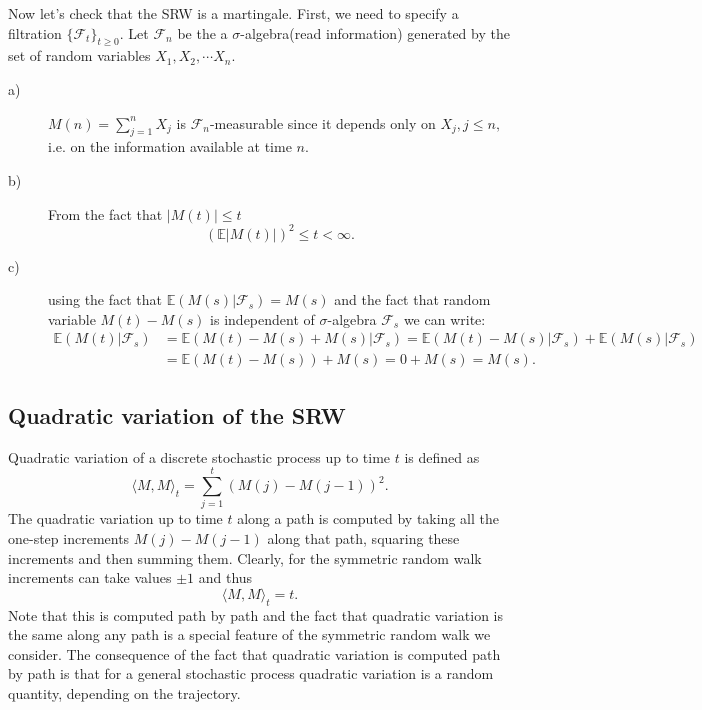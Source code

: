 \documentclass[reqno,psamsfonts, 10pt]{amsart}
\theoremstyle{remark}
\begin{document}
Now let's check that the SRW is a martingale. First, we need to
specify a filtration $\{ \mathcal{F}_t \}_{t \ge 0}.$ Let
$\mathcal{F}_n$ be the a $\sigma$-algebra(read information)
generated by the set of random variables $X_1, X_2, \dotsm X_n.$
\begin{description}
\item[a)] $M(n) = \sum \limits_{j=1}^n X_j$ is
$\mathcal{F}_n$-measurable since it depends only on $X_j, j
\le n,$ i.e. on the information available at time $n.$

\item[b)] From the fact that $|M(t)| \le t$
$$
\left(\mathbb{E}|M(t)|\right)^2 \le t < \infty.
$$

\item[c)] using the fact that $\mathbb{E}(M(s) |
\mathcal{F}_s) = M(s)$ and the fact that  random variable
$M(t) - M(s)$ is independent of $\sigma$-algebra
$\mathcal{F}_s$ we can write:
\begin{align}
\mathbb{E}(M(t) | \mathcal{F}_s) & = \mathbb{E}(M(t) - M(s)
+ M(s)| \mathcal{F}_s) = \mathbb{E}(M(t) - M(s)|
\mathcal{F}_s)
+ \mathbb{E}(M(s) | \mathcal{F}_s) \nonumber \\
& = \mathbb{E}(M(t) - M(s)) + M(s) = 0 + M(s) = M(s).
\end{align}

\end{description}



\subsection*{Quadratic variation of the SRW}

Quadratic variation of a discrete stochastic process up to time
$t$ is defined as
\begin{equation}
\langle M,M\rangle_t = \sum \limits_{j=1}^t(M(j) -
M(j-1))^2.
\end{equation}
The quadratic variation up to time $t$ along a path is computed by
taking all the one-step increments $M(j) - M(j-1)$ along that
path, squaring these increments and then summing them. Clearly,
for the symmetric random walk increments can take values $\pm 1$
and thus
\begin{equation}
\langle M,M\rangle_t = t.
\end{equation}
Note that this is computed path by path and the fact that
quadratic variation is the same along any path is a special
feature of the symmetric random walk we consider. The
consequence of the fact that quadratic variation is
computed path by path is that for a general stochastic
process quadratic variation is a random quantity, depending
on the trajectory.
\end{document}
